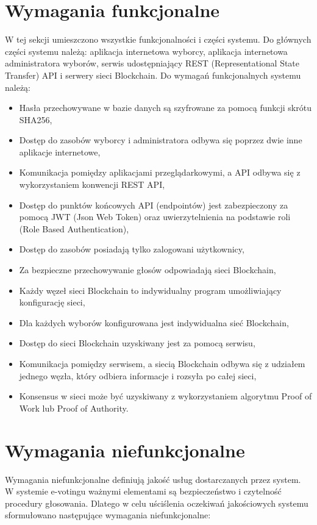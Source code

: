 \documentclass[a4paper,12pt]{book}
\begin{document}
\section {Wymagania funkcjonalne}

W tej sekcji umieszczono wszystkie funkcjonalności i części systemu. Do głównych części systemu należą: aplikacja internetowa wyborcy, aplikacja internetowa administratora wyborów,
serwis udostępniający REST (Representational State Transfer) API i serwery sieci Blockchain. Do wymagań funkcjonalnych systemu należą:

\begin{itemize}
	\item Hasła przechowywane w bazie danych są szyfrowane za pomocą funkcji skrótu SHA256,
	\item Dostęp do zasobów wyborcy i administratora odbywa się poprzez dwie inne aplikacje internetowe,
	\item Komunikacja pomiędzy aplikacjami przeglądarkowymi, a API odbywa się z wykorzystaniem konwencji REST API,
	\item Dostęp do punktów końcowych API (endpointów) jest zabezpieczony za pomocą JWT (Json Web Token) oraz uwierzytelnienia na podstawie roli (Role Based Authentication),
	\item Dostęp do zasobów posiadają tylko zalogowani użytkownicy,
	\item Za bezpieczne przechowywanie głosów odpowiadają sieci Blockchain,
	\item Każdy węzeł sieci Blockchain to indywidualny program umożliwiający konfigurację sieci,
	\item Dla każdych wyborów konfigurowana jest indywidualna sieć Blockchain,
	\item Dostęp do sieci Blockchain uzyskiwany jest za pomocą serwisu,
	\item Komunikacja pomiędzy serwisem, a siecią Blockchain odbywa się z udziałem jednego węzła, który odbiera informacje i rozsyła po całej sieci,
	\item Konsensus w sieci może być uzyskiwany z wykorzystaniem algorytmu Proof of Work lub Proof of Authority.
\end{itemize}

\section {Wymagania niefunkcjonalne}

Wymagania niefunkcjonalne definiują jakość usług dostarczanych przez system. W systemie e-votingu ważnymi elementami są bezpieczeństwo i czytelność procedury głosowania. Dlatego w celu uściślenia oczekiwań jakościowych systemu sformułowano następujące wymagania niefunkcjonalne:
\end{document}

